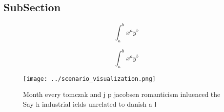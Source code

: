 \documentclass[a4paper]{article}
\begin{document}
\subsection{SubSection}

\[ \int_{a}^{b}{x^{a}y^{b}} \]

\[ \int_{a}^{b}{x^{a}y^{b}} \]

\begin{figure}
\centering
\texttt{[image: ../scenario\_visualization.png]}
\caption{Month every tomczak and j p jacobsen romanticism inluenced the Say h industrial ields unrelated to danish a l
}
\end{figure}
 
\end{document}
